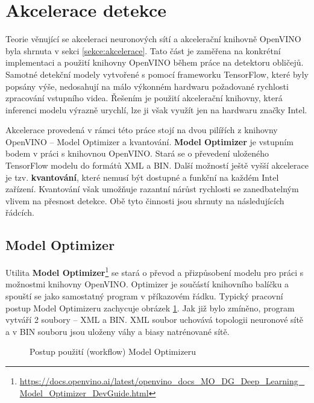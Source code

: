 \section{Akcelerace detekce}
\label{sekce:akcelerace_implementace}
Teorie věnující se akceleraci neuronových sítí a akcelerační knihovně OpenVINO byla shrnuta v sekci \ref{sekce:akcelerace}. Tato část je zaměřena na konkrétní implementaci a použití knihovny OpenVINO během práce na detektoru obličejů. Samotné detekční modely vytvořené s pomocí frameworku TensorFlow, které byly popsány výše, nedosahují na málo výkonném hardwaru požadované rychlosti zpracování vstupního videa. Řešením je použití akcelerační knihovny, která inferenci modelu výrazně urychlí, lze ji však využít jen na hardwaru značky Intel.

Akcelerace provedená v rámci této práce stojí na dvou pilířích z knihovny OpenVINO -- Model Optimizer a kvantování. \textbf{Model Optimizer} je vstupním bodem v práci s knihovnou OpenVINO. Stará se o převedení uloženého TensorFlow modelu do formátů XML a BIN. Další možností ještě vyšší akcelerace je tzv. \textbf{kvantování}, které nemusí být dostupné a funkční na každém Intel zařízení. Kvantování však umožňuje razantní nárůst rychlosti se zanedbatelným vlivem na přesnost detekce. Obě tyto činnosti jsou shrnuty na následujících řádcích.

\subsection*{Model Optimizer}
Utilita \textbf{Model Optimizer}\footnote{\url{https://docs.openvino.ai/latest/openvino_docs_MO_DG_Deep_Learning_Model_Optimizer_DevGuide.html}} se stará o převod a přizpůsobení modelu pro práci s možnostmi knihovny OpenVINO. Optimizer je součástí knihovního balíčku a spouští se jako samostatný program v příkazovém řádku. Typický pracovní postup Model Optimizeru zachycuje obrázek \ref{obrazek:moworkflow}. Jak již bylo zmíněno, program vytváří 2 soubory -- XML a BIN. XML soubor uchovává topologii neuronové sítě a v BIN souboru jsou uloženy váhy a biasy natrénované sítě.

\begin{figure}[H]
  \begin{center}
  \label{obrazek:moworkflow}
  \caption{Postup použití (workflow) Model Optimizeru}
  \end{center}
\end{figure}

